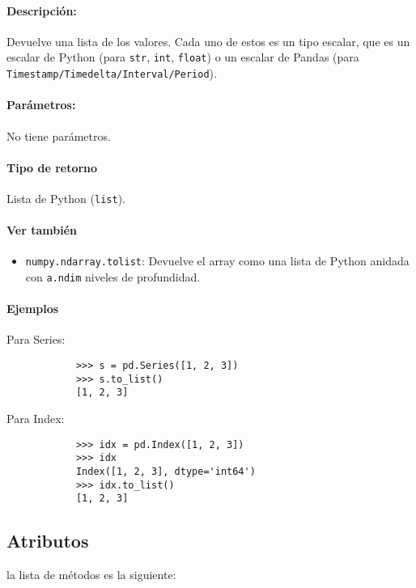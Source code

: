     \paragraph{Descripción:}
    Devuelve una lista de los valores. Cada uno de estos es un tipo escalar, que es un escalar de Python (para \texttt{str}, \texttt{int}, \texttt{float}) o un escalar de Pandas (para \texttt{Timestamp/Timedelta/Interval/Period}).

    \paragraph{Parámetros:}
    No tiene parámetros.

    \paragraph{Tipo de retorno}
    Lista de Python (\texttt{list}).

    \paragraph{Ver también}
    \begin{itemize}
        \item \texttt{numpy.ndarray.tolist}: Devuelve el array como una lista de Python anidada con \texttt{a.ndim} niveles de profundidad.
    \end{itemize}

    \paragraph{Ejemplos}
    Para Series:
    \begin{verbatim}
            >>> s = pd.Series([1, 2, 3])
            >>> s.to_list()
            [1, 2, 3]
            \end{verbatim}
    Para Index:
    \begin{verbatim}
            >>> idx = pd.Index([1, 2, 3])
            >>> idx
            Index([1, 2, 3], dtype='int64')
            >>> idx.to_list()
            [1, 2, 3]
            \end{verbatim}





    \subsection{Atributos}

    la lista de métodos es la siguiente:

